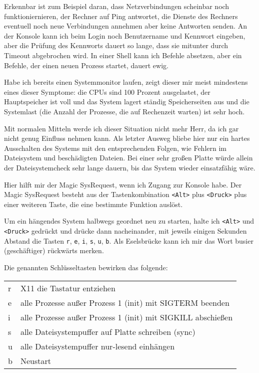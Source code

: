 Erkennbar ist zum Beispiel daran, dass Netzverbindungen scheinbar noch
funktioniernieren, der Rechner auf Ping antwortet, die Dienste des Rechners
eventuell noch neue Verbindungen annehmen aber keine Antworten senden. An der
Konsole kann ich beim Login noch Benutzername und Kennwort eingeben, aber die
Prüfung des Kennworts dauert so lange, dass sie mitunter durch Timeout
abgebrochen wird. In einer Shell kann ich Befehle absetzen, aber ein Befehle,
der einen neuen Prozess startet, dauert ewig.

Habe ich bereits einen Systemmonitor laufen, zeigt dieser mir meist mindestens
eines dieser Symptome: die CPUs sind 100 Prozent ausgelastet, der
Hauptspeicher ist voll und das System lagert ständig Speicherseiten aus und
die Systemlast (die Anzahl der Prozesse, die auf Rechenzeit warten) ist sehr
hoch.

Mit normalen Mitteln werde ich dieser Situation nicht mehr Herr, da ich gar
nicht genug Einfluss nehmen kann. Als letzter Ausweg bliebe hier nur ein
hartes Ausschalten des Systems mit den entsprechenden Folgen, wie Fehlern im
Dateisystem und beschädigten Dateien. Bei einer sehr großen Platte würde
allein der Dateisystemcheck sehr lange dauern, bis das System wieder
einsatzfähig wäre.

Hier hilft mir der Magic SysRequest, wenn ich Zugang zur Konsole habe. Der
Magic SysRequest besteht aus der Tastenkombination \verb?<Alt>? plus
\verb?<Druck>? plus einer weiteren Taste, die eine bestimmte Funktion auslöst.

Um ein hängendes System halbwegs geordnet neu zu starten, halte ich
\verb?<Alt>? und \verb?<Druck>? gedrückt und drücke dann nacheinander, mit
jeweils einigen Sekunden Abstand die Tasten \verb?r?, \verb?e?, \verb?i?,
\verb?s?, \verb?u?, \verb?b?. Als Eselsbrücke kann ich mir das Wort busier
(geschäftiger) rückwärts merken.

Die genannten Schlüsseltasten bewirken das folgende:

\begin{tabular}{l|l}
  r & X11 die Tastatur entziehen \\
  e & alle Prozesse außer Prozess 1 (init) mit SIGTERM beenden \\
  i & alle Prozesse außer Prozess 1 (init) mit SIGKILL abschießen \\
  s & alle Dateisystempuffer auf Platte schreiben (sync) \\
  u & alle Dateisystempuffer nur-lesend einhängen \\
  b & Neustart \\
\end{tabular}

